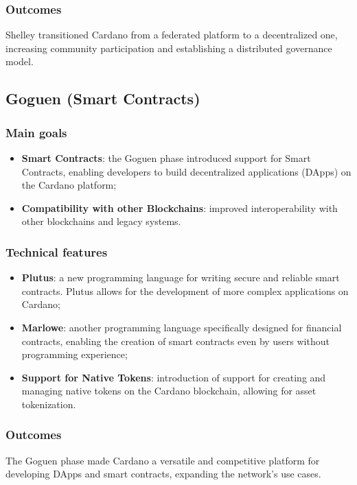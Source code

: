 \subsubsection*{Outcomes}
Shelley transitioned Cardano from a federated platform to a decentralized one, 
increasing community participation and establishing a distributed governance model.

\vspace{0.5cm}

\subsection{Goguen (Smart Contracts)}

\subsubsection*{Main goals}
\begin{itemize}
    \item \textbf{Smart Contracts}: the Goguen phase introduced support for \gls{Smart 
        Contracts}, enabling developers to build decentralized applications (DApps) 
        on the Cardano platform;
    \item \textbf{Compatibility with other Blockchains}: improved interoperability 
        with other blockchains and legacy systems.
\end{itemize}

\subsubsection*{Technical features}
\begin{itemize}
    \item \textbf{Plutus}: a new programming language for writing secure and reliable 
        smart contracts. Plutus allows for the development of more complex applications 
        on Cardano;
    \item \textbf{Marlowe}: another programming language specifically designed for 
        financial contracts, enabling the creation of smart contracts even by users 
        without programming experience;
    \item \textbf{Support for Native Tokens}: introduction of support for creating 
        and managing native tokens on the Cardano blockchain, allowing for asset 
        tokenization.
\end{itemize}

\subsubsection*{Outcomes}
The Goguen phase made Cardano a versatile and competitive platform for developing DApps 
and smart contracts, expanding the network's use cases.

